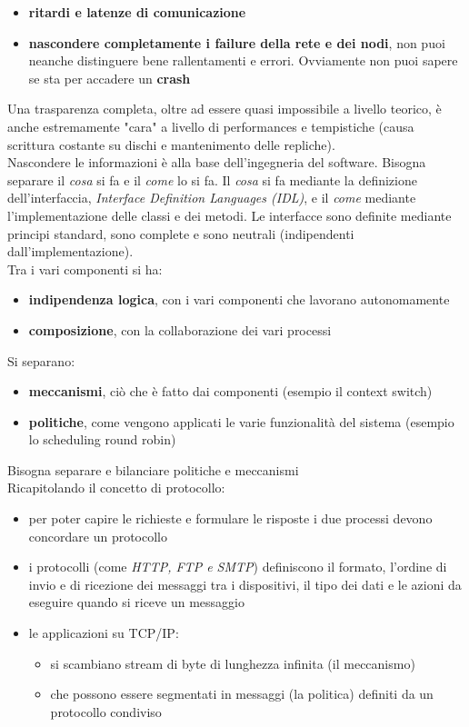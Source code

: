 \documentclass[a4paper,12pt, oneside]{book}
\begin{document}
\begin{itemize}
\item \textbf{ritardi e latenze di comunicazione}
\item \textbf{nascondere completamente i failure della rete e dei nodi}, non puoi neanche distinguere bene rallentamenti e errori. Ovviamente non puoi sapere se sta per accadere un \textbf{crash}
\end{itemize}
Una trasparenza completa, oltre ad essere quasi impossibile a livello teorico, è anche estremamente "cara" a livello di performances e tempistiche (causa scrittura costante su dischi e mantenimento delle repliche).\\
Nascondere le informazioni è alla base dell'ingegneria del software. Bisogna separare il \textit{cosa} si fa e il \textit{come} lo si fa. Il \textit{cosa} si fa mediante la definizione dell'interfaccia, \textit{Interface Definition Languages (IDL)}, e il \textit{come} mediante l'implementazione delle classi e dei metodi. Le interfacce sono definite mediante principi standard, sono complete e sono neutrali (indipendenti dall'implementazione).\\
Tra i vari componenti si ha:
\begin{itemize}
\item \textbf{indipendenza logica}, con i vari componenti che lavorano autonomamente
\item \textbf{composizione}, con la collaborazione dei vari processi
\end{itemize}
Si separano:
\begin{itemize}
\item \textbf{meccanismi}, ciò che è fatto dai componenti (esempio il context switch)
\item \textbf{politiche}, come vengono applicati le varie funzionalità del sistema (esempio lo scheduling round robin)
\end{itemize}
Bisogna separare e bilanciare politiche e meccanismi\\
Ricapitolando il concetto di protocollo:
\begin{itemize}
\item per poter capire le richieste e formulare le risposte i due processi devono concordare un protocollo
\item i protocolli (come \textit{HTTP, FTP e SMTP}) definiscono il formato, l'ordine di invio e di ricezione dei messaggi tra i dispositivi, il tipo dei dati e le azioni da eseguire quando si riceve un messaggio
\item le applicazioni su TCP/IP:
\begin{itemize}
\item si scambiano stream di byte di lunghezza infinita (il meccanismo)
\item che possono essere segmentati in messaggi (la politica) definiti da un protocollo condiviso
\end{itemize}
\end{itemize}
\end{document}
